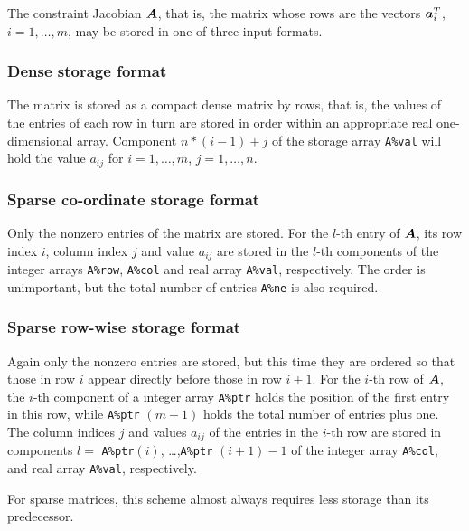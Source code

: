 \documentclass{galahad}
\begin{document}

\galmatrix
The constraint Jacobian ${\bm{A}}$, that is, the matrix 
whose rows are the vectors ${\bm{a}}_{i}^{T}$, $i = 1, \ldots , m$, 
may be stored in one of three input formats.

\subsubsection{Dense storage format}\label{dense}
The matrix is stored as a compact 
dense matrix by rows, that is, the values of the entries of each row in turn are
stored in order within an appropriate real one-dimensional array.
Component $n \ast (i-1) + j$ of the storage array {\tt A\%val} will hold the 
value $a_{ij}$ for $i = 1, \ldots , m$, $j = 1, \ldots , n$.

\subsubsection{Sparse co-ordinate storage format}\label{coordinate}
Only the nonzero entries of the matrix are stored. For the 
$l$-th entry of ${\bm{A}}$, its row index $i$, column index $j$ 
and value $a_{ij}$
are stored in the $l$-th components of the integer arrays {\tt A\%row}, 
{\tt A\%col} and real array {\tt A\%val}, respectively.
The order is unimportant, but the total
number of entries {\tt A\%ne} is also required. 

\subsubsection{Sparse row-wise storage format}\label{rowwise}
Again only the nonzero entries are stored, but this time
they are ordered so that those in row $i$ appear directly before those
in row $i+1$. For the $i$-th row of ${\bm{A}}$, the $i$-th component of a 
integer array {\tt A\%ptr} holds the position of the first entry in this row,
while {\tt A\%ptr} $(m+1)$ holds the total number of entries plus one.
The column indices $j$ and values $a_{ij}$ of the entries in the $i$-th row 
are stored in components 
$l =$ {\tt A\%ptr}$(i)$, \ldots ,{\tt A\%ptr} $(i+1)-1$ of the 
integer array {\tt A\%col}, and real array {\tt A\%val}, respectively. 

For sparse matrices, this scheme almost always requires less storage than 
its predecessor.

\end{document}
